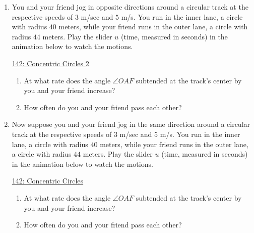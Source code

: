 \documentclass{ximera}
\begin{document}
\begin{question} \label{QOLfdfdthnhgfg}

\begin{enumerate}
\item You and your friend jog in opposite directions around a circular track at the respective speeds of $3$ m/sec and $5$ m/s. You run in the inner lane, a circle with radius $40$ meters, while your friend runs in the outer lane, a circle with radius $44$ meters. Play the slider $u$ (time, measured in seconds) in the animation below to watch the motions.

\begin{onlineOnly}
\begin{center}
\end{center}
\end{onlineOnly}

\href{https://www.desmos.com/calculator/a1jmg3x2mz}{142: Concentric Circles 2}

\begin{enumerate}
\item At what rate does the angle $\angle OAF$ subtended at the track's center by you and your friend increase?

\item How often do you and your friend pass each other?

\end{enumerate}


\item Now suppose you and your friend jog in the same direction around a circular track at the respective speeds of $3$ m/sec and $5$ m/s. You run in the inner lane, a circle with radius $40$ meters, while your friend runs in the outer lane, a circle with radius $44$ meters. Play the slider $u$ (time, measured in seconds) in the animation below to watch the motions.

\begin{onlineOnly}
\begin{center}
\end{center}
\end{onlineOnly}

\href{https://www.desmos.com/calculator/s8ua80pw91}{142: Concentric Circles}

\begin{enumerate}
\item At what rate does the angle $\angle OAF$ subtended at the track's center by you and your friend increase?

\item How often do you and your friend pass each other?

\end{enumerate}
\end{enumerate}
\end{question}
\end{document}

